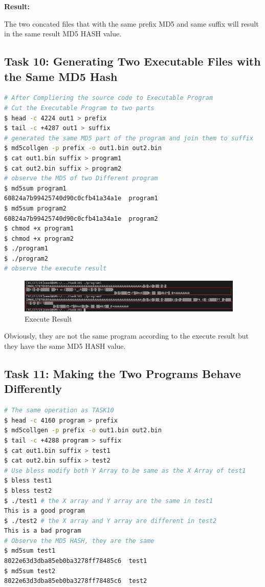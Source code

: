 \documentclass[a4paper,11pt]{article}
\begin{document}
\textbf{Result:} 

The two concated files that with the same prefix MD5 and same suffix will result in the same result MD5 HASH value.

\subsection{Task 10: Generating Two Executable Files with the Same MD5 Hash}

\begin{lstlisting}[caption={MD5 Executable Program},label={lst:task3.10},language=BASH,breaklines=true]
# After Compliering the source code to Executable Program
# Cut the Executable Program to two parts
$ head -c 4224 out1 > prefix
$ tail -c +4287 out1 > suffix
# generated the same MD5 part of the program and join them to suffix
$ md5collgen -p prefix -o out1.bin out2.bin
$ cat out1.bin suffix > program1
$ cat out2.bin suffix > program2
# observe the MD5 of two Different program
$ md5sum program1
60824a7b99425740d90c0cfb41a34a1e  program1
$ md5sum program2
60824a7b99425740d90c0cfb41a34a1e  program2
$ chmod +x program1
$ chmod +x program2
$ ./program1
$ ./program2
# observe the execute result
\end{lstlisting} 

\begin{figure}[h]
    \centering
       \includegraphics[width=0.96\textwidth]{figures/task10/executablefiles.png}
    \caption{Execute Result}\label{fig:task10}
\end{figure}

Obviously, they are not the same program according to the execute result but they have the same MD5 HASH value.

\subsection{Task 11: Making the Two Programs Behave Differently}

\begin{lstlisting}[caption={Different Behavior Program},label={lst:task3.11},language=BASH,breaklines=true]
# The same operation as TASK10
$ head -c 4160 program > prefix
$ md5collgen -p prefix -o out1.bin out2.bin
$ tail -c +4288 program > suffix
$ cat out1.bin suffix > test1
$ cat out2.bin suffix > test2
# Use bless modify both Y Array to be same as the X Array of test1
$ bless test1
$ bless test2
$ ./test1 # the X array and Y array are the same in test1
This is a good program
$ ./test2 # the X array and Y array are different in test2
This is a bad program
# Observe the MD5 HASH, they are the same
$ md5sum test1
8022e63d3dba85eb0ba3278ff78485c6  test1
$ md5sum test2
8022e63d3dba85eb0ba3278ff78485c6  test2
\end{lstlisting} 
\end{document}
